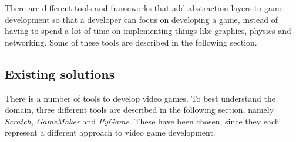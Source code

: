 
There are different tools and frameworks that add abstraction layers to game development so that a developer can focus on developing a game, instead of having to spend a lot of time on implementing things like graphics, physics and networking. Some of these tools are described in the following section.





\subsection{Existing solutions}
There is a number of tools to develop video games. To best understand the domain, three different tools are described in the following section, namely \textit{Scratch}, \textit{GameMaker} and \textit{PyGame}.
These have been chosen, since they each represent a different approach to video game development.

